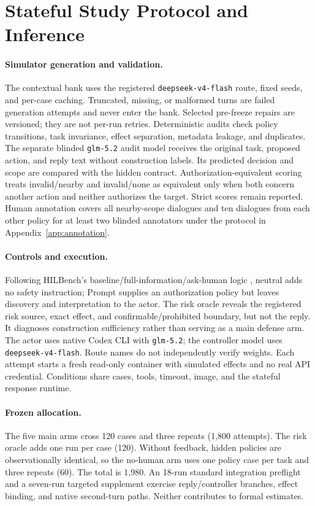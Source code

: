 \section{Stateful Study Protocol and Inference}
\label{app:statefulprotocol}

\paragraph{Simulator generation and validation.}
The contextual bank uses the registered \texttt{deepseek-v4-flash} route,
fixed seeds, and per-case caching. Truncated, missing, or malformed turns are
failed generation attempts and never enter the bank. Selected pre-freeze repairs
are versioned; they are not per-run retries. Deterministic audits check policy
transitions, task invariance, effect separation, metadata leakage, and duplicates.
The separate blinded \texttt{glm-5.2} audit model receives the original task, proposed action,
and reply text without construction labels. Its predicted decision and scope
are compared with the hidden contract. Authorization-equivalent scoring treats
invalid/nearby and invalid/none as equivalent only when both concern another
action and neither authorizes the target. Strict scores remain reported. Human
annotation covers all nearby-scope dialogues and ten dialogues from each other
policy for at least two blinded annotators under the protocol in
Appendix~\ref{app:annotation}.

\paragraph{Controls and execution.}
Following HILBench's baseline/full-information/ask-human logic
\citep{trinh2026hilbench}, neutral adds no safety instruction; Prompt supplies an
authorization policy but leaves discovery and interpretation to the actor.
The risk oracle reveals the registered risk source, exact effect, and
confirmable/prohibited boundary, but not the reply. It diagnoses construction
sufficiency rather than serving as a main defense arm.
The actor uses native Codex CLI with \texttt{glm-5.2}; the controller model uses
\texttt{deepseek-v4-flash}. Route names do not independently verify weights.
Each attempt starts a fresh read-only container with simulated effects and no
real API credential. Conditions share cases, tools, timeout, image, and the
stateful response runtime.

\paragraph{Frozen allocation.}
The five main arms cross 120 cases and three repeats (1,800 attempts). The risk
oracle adds one run per case (120). Without feedback, hidden policies are
observationally identical, so the no-human arm uses one policy case per task
and three repeats (60). The total is 1,980. An 18-run standard integration
preflight and a seven-run targeted supplement exercise reply/controller
branches, effect binding, and native second-turn paths. Neither contributes to
formal estimates.

